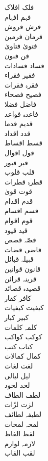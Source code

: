 \documentclass[a4paper]{article}
\begin{document}
\begin{multicols}{3}
\begin{tabbing}
فلک \> افلاک\\
فہم \> افہام\\
فرش \> فروش\\
فرمان \> فرمین\\
فتویٰ \> فتاویٰ\\
فن \> فنون\\
فساد \> فسادات\\
فقیر \> فقراء\\
فقرہ \> فقرات\\
فصیح \> فصحاء\\
فاضل \> فضلا\\
فاعدہ \> فواعد\\
قدیم \> قدما\\
قدد \> اقداد\\
قسط \> اقساط\\
قول \> اقوال\\
قبر \> قبور\\
قلب \> قلوب\\
قطرہ \> قطرات\\
قوت \> قویٰ\\
قدم \> اقدام\\
قسم \> اقسام\\
قوم \> اقوام\\
قید \> قیود\\
قصّہ \> قصص\\
قاضی \> قضات\\
قبیلہ \> قبائل\\
قانون \> قوانین\\
قرینہ \> قرائن\\
قصیدہ \> قصائد\\
کافر \> کفار\\
کیفیت \> کیفیات\\
کبیر \> کبار\\
کلمہ \> کلمات\\
کوکب \> کواکب\\
کتاب \> کتب\\
کمال \> کمالات\\
لغت \> لغات\\
لیل \> لیالی\\
لحد \> لحود\\
لطف \> الطاف\\
لزت \> لزّات\\
لطیفہ \> لطائف\\
لمحہ \> لمحات\\
لفظ \> الفاظ\\
لازمہ \> لوازم\\
لقب \> القاب\\

\end{tabbing}
\end{multicols}
\end{document}
